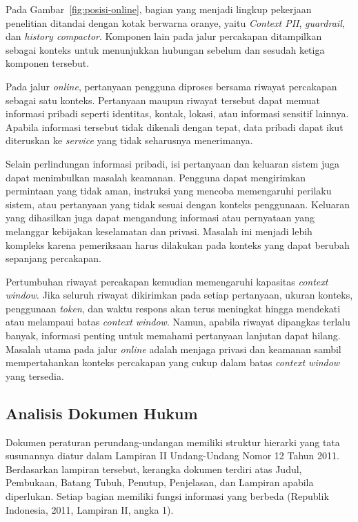 Pada Gambar~\ref{fig:posisi-online}, bagian yang menjadi lingkup pekerjaan
penelitian ditandai dengan kotak berwarna oranye, yaitu \emph{Context PII},
\emph{guardrail}, dan \emph{history compactor}. Komponen lain pada jalur
percakapan ditampilkan sebagai konteks untuk menunjukkan hubungan sebelum dan
sesudah ketiga komponen tersebut.

Pada jalur \emph{online}, pertanyaan pengguna diproses bersama riwayat
percakapan sebagai satu konteks. Pertanyaan maupun riwayat tersebut dapat
memuat informasi pribadi seperti identitas, kontak, lokasi, atau informasi
sensitif lainnya. Apabila informasi tersebut tidak dikenali dengan tepat, data
pribadi dapat ikut diteruskan ke \emph{service} yang tidak seharusnya menerimanya.

Selain perlindungan informasi pribadi, isi pertanyaan dan keluaran sistem juga
dapat menimbulkan masalah keamanan. Pengguna dapat mengirimkan permintaan yang
tidak aman, instruksi yang mencoba memengaruhi perilaku sistem, atau pertanyaan
yang tidak sesuai dengan konteks penggunaan. Keluaran yang dihasilkan juga
dapat mengandung informasi atau pernyataan yang melanggar kebijakan
keselamatan dan privasi. Masalah ini menjadi lebih kompleks karena pemeriksaan
harus dilakukan pada konteks yang dapat berubah sepanjang percakapan.

Pertumbuhan riwayat percakapan kemudian memengaruhi kapasitas \emph{context
window}. Jika seluruh riwayat dikirimkan pada setiap pertanyaan, ukuran konteks,
penggunaan \emph{token}, dan waktu respons akan terus meningkat hingga mendekati atau
melampaui batas \emph{context window}. Namun, apabila riwayat dipangkas terlalu
banyak, informasi penting untuk memahami pertanyaan lanjutan dapat hilang.
Masalah utama pada jalur \emph{online} adalah menjaga privasi
dan keamanan sambil mempertahankan konteks percakapan yang cukup dalam batas
\emph{context window} yang tersedia.

\subsection{Analisis Dokumen Hukum}
\label{subsec:analisis-dokumen-hukum}

Dokumen peraturan perundang-undangan memiliki struktur hierarki yang tata
susunannya diatur dalam Lampiran II Undang-Undang Nomor 12 Tahun 2011.
Berdasarkan lampiran tersebut, kerangka dokumen terdiri atas Judul, Pembukaan, Batang
Tubuh, Penutup, Penjelasan, dan Lampiran apabila diperlukan. Setiap bagian
memiliki fungsi informasi yang berbeda (Republik Indonesia, 2011, Lampiran II,
angka 1).

